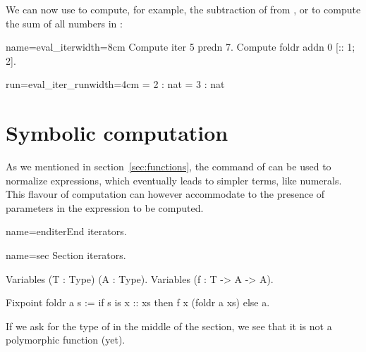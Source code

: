 We can now use  to compute, for example,
the subtraction of  from , or 
to compute the
sum of all numbers in \C{[:: 1; 2]}:

\begin{coq-left}{name=eval_iter}{width=8cm}
Compute iter 5 predn 7.
Compute foldr addn 0 [:: 1; 2].
\end{coq-left}
\begin{coqout-right}{run=eval_iter_run}{width=4cm}
 = 2 : nat
 = 3 : nat
\end{coqout-right}


\section{Symbolic computation}\label{sec:symcomp}

As we mentioned in section~\ref{sec:functions}, the 
command of \Coq{} can be used to normalize expressions, which
eventually leads to simpler terms, like numerals. This flavour of
computation can however accommodate to the presence of parameters in
the expression to be computed.


\begin{coqdef}{name=enditer}End iterators.\end{coqdef}

\begin{coq}{name=sec}{}
Section iterators.

Variables (T : Type) (A : Type).
Variables (f : T -> A -> A).

Fixpoint foldr a s :=
  if s is x :: xs then f x (foldr a xs) else a.
\end{coq}

If we ask for the type of
 in the middle of the section, we see that
it is not a polymorphic function (yet).


